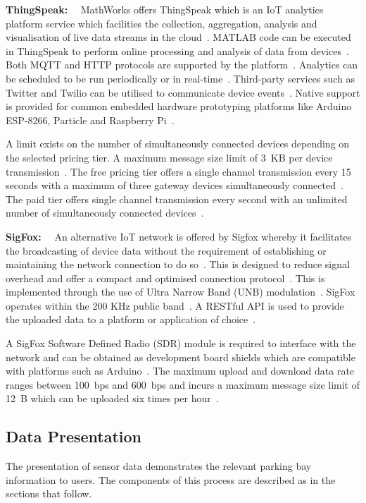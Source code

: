 \documentclass[10pt,twocolumn]{witseiepaper}
\begin{document}
				\textbf{ThingSpeak:}~~
				MathWorks offers ThingSpeak which is an IoT analytics platform service which facilities the collection, aggregation, analysis and visualisation of live data streams in the cloud~\cite{thingspeak}. MATLAB code can be executed in ThingSpeak to perform online processing and analysis of data from devices~\cite{thingspeak}. Both MQTT and HTTP protocols are supported by the platform~\cite{thingspeak}. Analytics can be scheduled to be run periodically or in real-time~\cite{thingspeak}. Third-party services such as Twitter and Twilio can be utilised to communicate device events~\cite{thingspeak}. Native support is provided for common embedded hardware prototyping platforms like Arduino ESP-8266, Particle and Raspberry Pi~\cite{thingspeak}.
				
				A limit exists on the number of simultaneously connected devices depending on the selected pricing tier. A maximum message size limit of 3~KB per device transmission~\cite{thing-quota}. The free pricing tier offers a single channel transmission every 15 seconds with a maximum of three gateway devices simultaneously connected~\cite{thing-quota}. The paid tier offers single channel transmission every second with an unlimited number of simultaneously connected devices~\cite{thing-quota}.
				
				\textbf{SigFox:}~~
				An alternative IoT network is offered by Sigfox whereby it facilitates the broadcasting of device data without the requirement of establishing or maintaining the network connection to do so~\cite{sigfox-tech}. This is designed to reduce signal overhead and offer a compact and optimised connection protocol~\cite{sigfox-security}. This is implemented through the use of Ultra Narrow Band (UNB) modulation~\cite{sigfox-tech}. SigFox operates within the 200 KHz public band~\cite{sigfox-tech}. A RESTful API is used to provide the uploaded data to a platform or application of choice~\cite{sigfox-security}.
				
				A SigFox Software Defined Radio (SDR) module is required to interface with the network and can be obtained as development board shields which are compatible with platforms such as Arduino~\cite{sigfox-tech}. The maximum upload and download data rate ranges between 100~bps and 600~bps and incurs a maximum message size limit of 12~B which can be uploaded six times per hour~\cite{sigfox-tech}.
	
	\subsection{Data Presentation}
		The presentation of sensor data demonstrates the relevant parking bay information to users. The components of this process are described as in the sections that follow.
		
\end{document}
